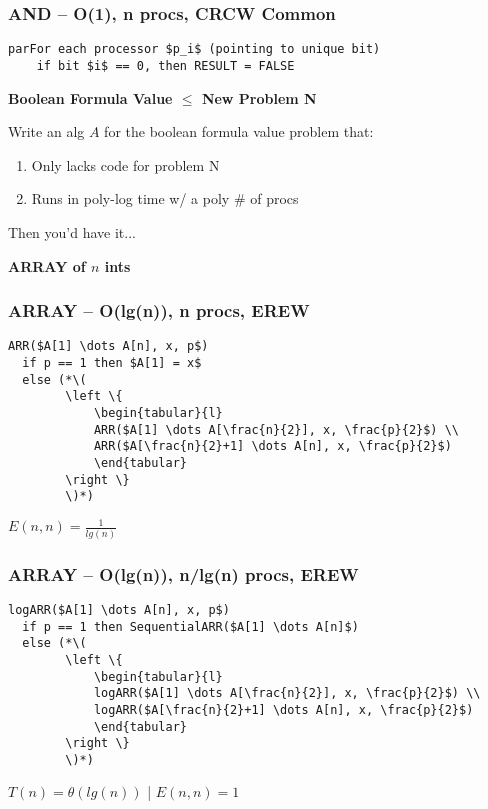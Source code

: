 \documentclass[12pt]{article}
\providecommand{\tightlist}{
    \setlength{\itemsep}{0pt}\setlength{\parskip}{0pt}
}
\providecommand{\reducible}[2]{
  \textbf{#1} $\leq$ \textbf{#2}
}
\begin{document}
\subsubsection*{AND -- O(1), n procs, CRCW Common}
\begin{lstlisting}
parFor each processor $p_i$ (pointing to unique bit)
    if bit $i$ == 0, then RESULT = FALSE
\end{lstlisting}


\begin{centering}\textbf{\reducible{Boolean Formula Value}{New Problem N}}\par\end{centering}
Write an alg $A$ for the boolean formula value problem that:\\
\begin{enumerate}\tightlist
  \item Only lacks code for problem N
  \item Runs in poly-log time w/ a poly \# of procs
\end{enumerate}
Then you'd have it...


\begin{centering}\textbf{ARRAY of $n$ ints}\par\end{centering}
\subsubsection*{ARRAY -- O(lg(n)), n procs, EREW}
\begin{lstlisting}
ARR($A[1] \dots A[n], x, p$)
  if p == 1 then $A[1] = x$
  else (*\(
        \left \{
            \begin{tabular}{l}
            ARR($A[1] \dots A[\frac{n}{2}], x, \frac{p}{2}$) \\
            ARR($A[\frac{n}{2}+1] \dots A[n], x, \frac{p}{2}$)
            \end{tabular}
        \right \}
        \)*)
\end{lstlisting}
$E(n,n) = \frac{1}{lg(n)}$
\subsubsection*{ARRAY -- O(lg(n)), n/lg(n) procs, EREW}
\begin{lstlisting}
logARR($A[1] \dots A[n], x, p$)
  if p == 1 then SequentialARR($A[1] \dots A[n]$)
  else (*\(
        \left \{
            \begin{tabular}{l}
            logARR($A[1] \dots A[\frac{n}{2}], x, \frac{p}{2}$) \\
            logARR($A[\frac{n}{2}+1] \dots A[n], x, \frac{p}{2}$)
            \end{tabular}
        \right \}
        \)*)
\end{lstlisting}
$T(n) = \theta(lg(n))$ | $E(n,n) = 1$
\end{document}
